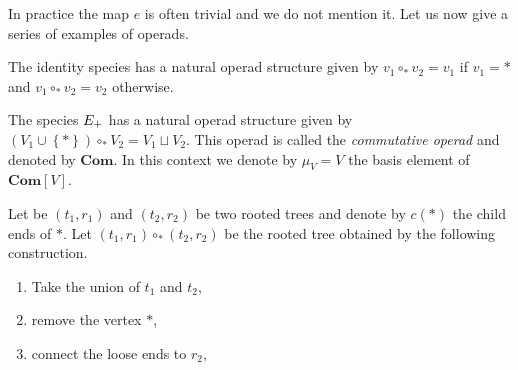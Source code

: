 \documentclass[11pt]{article}
\theoremstyle{definition}
\numberwithin{equation}{section}
\newcommand{\set}[1]{\left\{#1\right\}}
\newcommand{\spe}[1]{\normalfont{\textsc{#1}}}
\newcommand{\op}[1]{\mathbf{#1}}
\newcommand{\comp}[1][\ast]{\circ_{#1}}
\newcommand{\Sym}{\spe{E}}
\newcommand{\Com}{\op{Com}}
\begin{document}
In practice the map $e$ is often trivial and we do not mention it. Let us now give a series of examples of
operads.

\begin{description}\label{ex_operad}
    \item[Identity.] The identity species has a natural operad structure given by $v_1\comp v_2 = v_1$ if
    $v_1=\ast$ and $v_1\comp v_2=v_2$ otherwise.
    \item[Com.] The species $\Sym_+$ has a natural operad structure given by 
    $(V_1\cup\set{\ast})\comp V_2 = V_1\sqcup V_2$. This operad is called the {\em commutative operad} and denoted 
    by $\Com$. 
    In this context we denote by $\mu_V=V$ the basis element of $\Com[V]$.
    \item[NAP.] Let be $(t_1,r_1)$ and $(t_2,r_2)$ be two rooted trees and denote by $c(\ast)$ the child ends of $\ast$. 
    Let $(t_1,r_1)\comp (t_2,r_2)$ be the rooted tree obtained by the following construction.
    \begin{enumerate}
        \item Take the union of $t_1$ and $t_2$,

        \item remove the vertex $\ast$,

        \item connect the loose ends to $r_2$,


\end{enumerate}
\end{description}
\end{document}
